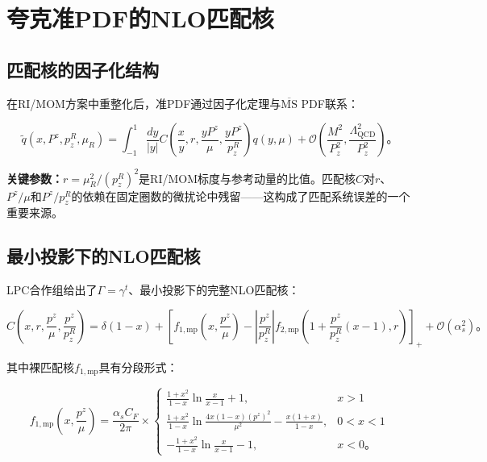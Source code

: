 \documentclass[12pt,a4paper]{ctexart}
\theoremstyle{definition}
\begin{document}
\section{夸克准PDF的NLO匹配核}

\subsection{匹配核的因子化结构}

在RI/MOM方案中重整化后，准PDF通过因子化定理与$\overline{\text{MS}}$ PDF联系\cite{Liu2019isovector,Izubuchi2018}：

\begin{equation}
\tilde{q}(x, P^z, p^R_z, \mu_R) = \int_{-1}^{1} \frac{dy}{|y|} C\left(\frac{x}{y}, r, \frac{yP^z}{\mu}, \frac{yP^z}{p^R_z}\right) q(y, \mu) + \mathcal{O}\left(\frac{M^2}{P^2_z}, \frac{\Lambda^2_{\text{QCD}}}{P^2_z}\right)。
\label{eq:matching}
\end{equation}

\textbf{关键参数：}$r = \mu^2_R/(p^R_z)^2$是RI/MOM标度与参考动量的比值。匹配核$C$对$r$、$P^z/\mu$和$P^z/p^R_z$的依赖在固定圈数的微扰论中残留——这构成了匹配系统误差的一个重要来源\cite{Liu2019isovector}。

\subsection{最小投影下的NLO匹配核}

LPC合作组\cite{Liu2019isovector}给出了$\Gamma = \gamma^t$、最小投影下的完整NLO匹配核：

\begin{equation}
C\left(x, r, \frac{p^z}{\mu}, \frac{p^z}{p^R_z}\right) = \delta(1-x) + \left[ f_{1,\text{mp}}\left(x, \frac{p^z}{\mu}\right) - \left|\frac{p^z}{p^R_z}\right| f_{2,\text{mp}}\left(1 + \frac{p^z}{p^R_z}(x-1), r\right) \right]_+ + \mathcal{O}(\alpha^2_s)。
\label{eq:matching_coeff}
\end{equation}

其中裸匹配核$f_{1,\text{mp}}$具有分段形式\cite{Liu2019isovector}：

\begin{equation}
f_{1,\text{mp}}\left(x, \frac{p^z}{\mu}\right) = \frac{\alpha_s C_F}{2\pi} \times
\begin{cases}
\frac{1+x^2}{1-x} \ln\frac{x}{x-1} + 1, & x > 1 \\[6pt]
\frac{1+x^2}{1-x} \ln\frac{4x(1-x)(p^z)^2}{\mu^2} - \frac{x(1+x)}{1-x}, & 0 < x < 1 \\[6pt]
-\frac{1+x^2}{1-x} \ln\frac{x}{x-1} - 1, & x < 0。
\end{cases}
\label{eq:f1mp}
\end{equation}
\end{document}
